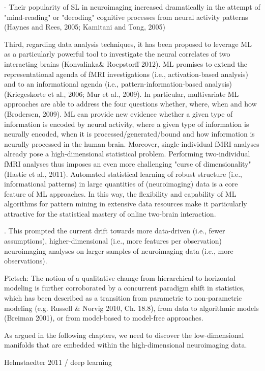 \documentclass[authoryear,review,3p]{elsarticle}
\begin{document}
- Their popularity of SL in neuroimaging increased dramatically in the attempt of "mind-reading" or "decoding" cognitive processes from neural activity patterns (Haynes and Rees, 2005; Kamitani and Tong, 2005)


Third, regarding data analysis techniques, it has been proposed to leverage ML as a particularly powerful tool to investigate the neural correlates of two interacting brains (Konvalinka\& Roepstorff 2012). ML promises to extend the representational agenda of fMRI investigations (i.e., activation-based analysis) and to an informational agenda (i.e., pattern-information-based analysis) (Kriegeskorte et al., 2006; Mur et al., 2009). In particular, multivariate ML approaches are able to address the four questions whether, where, when and how (Brodersen, 2009). ML can provide new evidence whether a given type of information is encoded by neural activity, where a given type of information is neurally encoded, when it is processed/generated/bound and how information is neurally processed in the human brain. Moreover, single-individual fMRI analyses already pose a high-dimensional statistical problem. Performing two-individual fMRI analyses thus imposes an even more challenging "curse of dimensionality" (Hastie et al., 2011). Automated statistical learning of robust structure (i.e., informational patterns) in large quantities of (neuroimaging) data is a core feature of ML approaches. In this way, the flexibility and capability of ML algorithms for pattern mining in extensive data resources make it particularly attractive for the statistical mastery of online two-brain interaction.

. This prompted the current drift towards more data-driven (i.e., fewer assumptions), higher-dimensional (i.e., more features per observation) neuroimaging analyses on larger samples of neuroimaging data (i.e., more observations).


Pietsch:
The notion of a qualitative change from hierarchical to horizontal modeling is further corroborated by a concurrent paradigm shift in statistics, which has been described as a transition from parametric to non-parametric modeling (e.g. Russell \& Norvig 2010, Ch. 18.8), from data to algorithmic models (Breiman 2001), or from model-based to model-free approaches.


As argued in the following chapters,
we need to discover
the low-dimensional manifolds that are
embedded within the high-dimensional neuroimaging data.

Helmstaedter 2011 / deep learning
\end{document}
